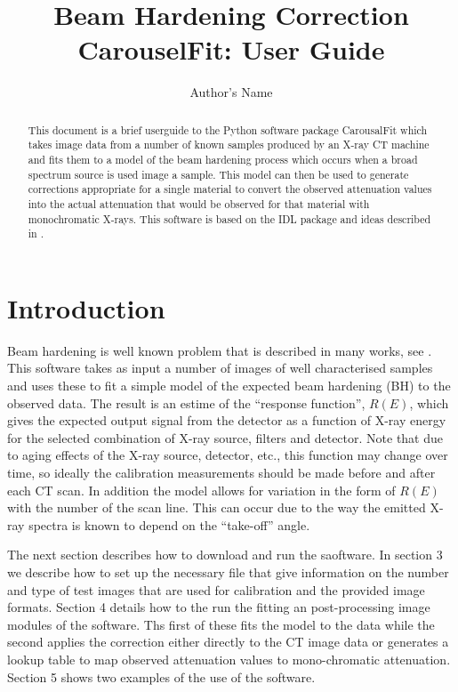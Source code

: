 \documentclass{article}
\begin{document}
\title{Beam Hardening Correction CarouselFit: User Guide}
\author{Author's Name}

\maketitle

\begin{abstract}
This document is a brief userguide to the Python software package CarousalFit which takes image
data from a number of known samples produced by an X-ray CT machine and fits them to a model of
the beam hardening process which occurs when a broad spectrum source is used image a sample.
This model can then be used to generate corrections appropriate for a single material to convert
the observed attenuation values into the actual attenuation that would be observed for that material
with monochromatic X-rays.
This software is based on the IDL package and ideas described in \cite{davis}.
\end{abstract}

\section{Introduction}
Beam hardening is well known problem that is described in many works, see \cite{davis}.
This software takes as input a number of images of well characterised samples and uses these
to fit a simple model of the expected beam hardening (BH) to the observed data.
The result is an estime of the ``response function'', $R(E)$, which gives the expected output signal
from the detector as a function of X-ray energy for the selected combination of X-ray source, filters
and detector.
Note that due to aging effects of the X-ray source, detector, etc., this function may change over time,
so ideally the calibration measurements should be made before and after each CT scan.
In addition the model allows for variation in the form of $R(E)$ with the number of the scan line.
This can occur due to the way the emitted X-ray spectra is known to depend on the ``take-off'' angle.

The next section describes how to download and run the saoftware.
In section 3 we describe how to set up the necessary file that give
information on the number and type of test images that are used for calibration and the provided
image formats.
Section 4 details how to the run the fitting an post-processing image modules of the software.
Ths first of these fits the model to the data while the second applies the correction either
directly to the CT image data or generates a lookup table to map observed attenuation values to
mono-chromatic attenuation.
Section 5 shows two examples of the use of the software.
\end{document}
